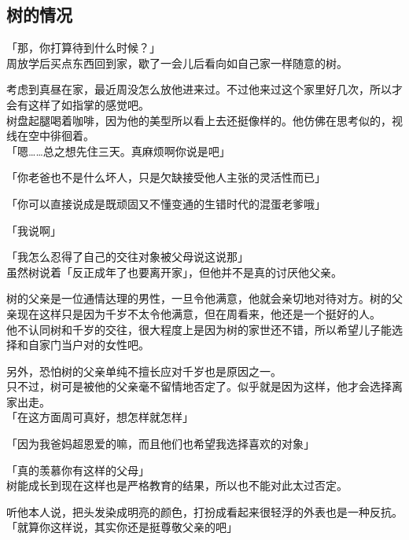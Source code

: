 \subsection{树的情况}

「那，你打算待到什么时候？」\\

周放学后买点东西回到家，歇了一会儿后看向如自己家一样随意的树。

考虑到真昼在家，最近周没怎么放他进来过。不过他来过这个家里好几次，所以才会有这样了如指掌的感觉吧。\\

树盘起腿喝着咖啡，因为他的美型所以看上去还挺像样的。他仿佛在思考似的，视线在空中徘徊着。\\

「嗯……总之想先住三天。真麻烦啊你说是吧」

「你老爸也不是什么坏人，只是欠缺接受他人主张的灵活性而已」

「你可以直接说成是既顽固又不懂变通的生错时代的混蛋老爹哦」

「我说啊」

「我怎么忍得了自己的交往对象被父母说这说那」\\

虽然树说着「反正成年了也要离开家」，但他并不是真的讨厌他父亲。

树的父亲是一位通情达理的男性，一旦令他满意，他就会亲切地对待对方。树的父亲现在这样只是因为千岁不太令他满意，但在周看来，他还是一个挺好的人。\\

他不认同树和千岁的交往，很大程度上是因为树的家世还不错，所以希望儿子能选择和自家门当户对的女性吧。

另外，恐怕树的父亲单纯不擅长应对千岁也是原因之一。\\

只不过，树可是被他的父亲毫不留情地否定了。似乎就是因为这样，他才会选择离家出走。\\

「在这方面周可真好，想怎样就怎样」

「因为我爸妈超恩爱的嘛，而且他们也希望我选择喜欢的对象」

「真的羡慕你有这样的父母」\\

树能成长到现在这样也是严格教育的结果，所以也不能对此太过否定。

听他本人说，把头发染成明亮的颜色，打扮成看起来很轻浮的外表也是一种反抗。\\

「就算你这样说，其实你还是挺尊敬父亲的吧」

